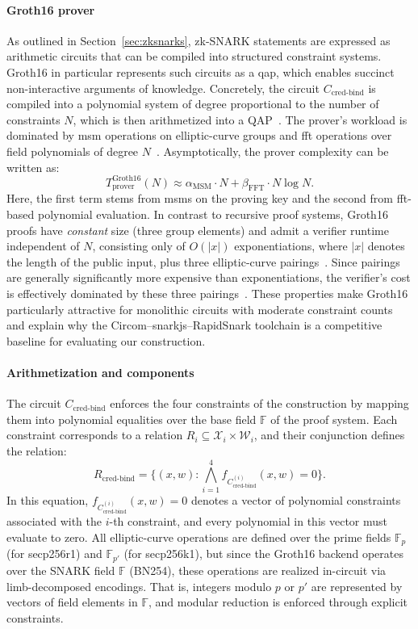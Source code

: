 \paragraph{Groth16 prover}
As outlined in Section~\ref{sec:zksnarks}, zk-SNARK statements are expressed as arithmetic circuits that can be compiled into structured constraint systems. Groth16 in particular represents such circuits as a \acrfull{qap}, which enables succinct non-interactive arguments of knowledge. Concretely, the circuit $C_{\text{cred-bind}}$ is compiled into a polynomial system of degree proportional to the number of constraints $N$, which is then arithmetized into a QAP~\cite{groth2016size}. The prover’s workload is dominated by \acrfull{msm} operations on elliptic-curve groups and \acrfull{fft} operations over field polynomials of degree $N$~\cite{groth2016size,cryptoeprint:2019/1047}. Asymptotically, the prover complexity can be written as:
\[
T_{\text{prover}}^{\text{Groth16}}(N) 
\approx \alpha_{\text{MSM}} \cdot N + \beta_{\text{FFT}} \cdot N\log N.
\]
Here, the first term stems from \acrshort{msm}s on the proving key and the second from \acrshort{fft}-based polynomial evaluation. In contrast to recursive proof systems, Groth16 proofs have \emph{constant} size (three group elements) and admit a verifier runtime independent of $N$, consisting only of $O(|x|)$ exponentiations, where $|x|$ denotes the length of the public input, plus three elliptic-curve pairings~\cite{groth2016size}. Since pairings are generally significantly more expensive than exponentiations, the verifier’s cost is effectively dominated by these three pairings~\cite{boneh2020moderncrypto}. These properties make Groth16 particularly attractive for monolithic circuits with moderate constraint counts and explain why the Circom--snarkjs--RapidSnark toolchain is a competitive baseline for evaluating our construction.

\paragraph{Arithmetization and components}
The circuit $C_{\text{cred-bind}}$ enforces the four constraints of the construction by mapping them into polynomial equalities over the base field $\mathbb{F}$ of the proof system. Each constraint corresponds to a relation $R_i \subseteq \mathcal{X}_i \times \mathcal{W}_i$, and their conjunction defines the relation:
\[
R_{\text{cred-bind}} = \{(x,w) : \bigwedge_{i=1}^4 f_{C_{\text{cred-bind}}^{(i)}}(x,w)=0\}.
\]
In this equation, $f_{C_{\text{cred-bind}}^{(i)}}(x,w)=0$ denotes a vector of polynomial constraints associated with the $i$-th constraint, and every polynomial in this vector must evaluate to zero. All elliptic-curve operations are defined over the prime fields $\mathbb{F}_p$ (for secp256r1) and $\mathbb{F}_{p'}$ (for secp256k1), but since the Groth16 backend operates over the SNARK field $\mathbb{F}$ (BN254), these operations are realized in-circuit via limb-decomposed encodings. That is, integers modulo $p$ or $p'$ are represented by vectors of field elements in $\mathbb{F}$, and modular reduction is enforced through explicit constraints.

